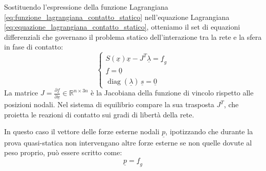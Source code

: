 Sostituendo l'espressione della funzione Lagrangiana \eqref{eq:funzione_lagrangiana_contatto_statico} nell'equazione Lagrangiana \eqref{eq:equazione_lagrangiana_contatto_statico}, otteniamo il set di equazioni differenziali che governano il problema statico dell'interazione tra la rete e la sfera in fase di contatto: 
\begin{equation}
  \begin{cases}
    S(\underline{x})\underline{x} - J^{T}\underline{\lambda} = \underline{f}_g\\
    \underline{f} = \underline{0}\\
    \operatorname{diag}(\underline{\lambda})\, \underline{s} = \underline{0}
  \end{cases}
  \label{eq:formulazione_statica_contatto}
\end{equation}
La matrice $J = \frac{\partial \underline{f}}{\partial \underline{x}} \in \mathbb{R}^{n \times 3n}$ è la Jacobiana della funzione di vincolo rispetto alle posizioni nodali. Nel sistema di equilibrio compare la sua trasposta $J^T$, che proietta le reazioni di contatto sui gradi di libertà della rete.

In questo caso il vettore delle forze esterne nodali $\underline{p}$, ipotizzando che durante la prova quasi-statica non intervengano altre forze esterne se non quelle dovute al peso proprio, può essere scritto come: 
\begin{equation}
  \underline{p} = \underline{f}_g 
\end{equation}

